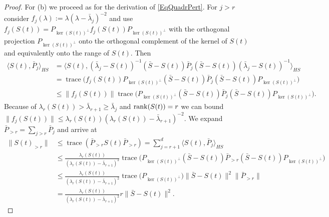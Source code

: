 \documentclass[preprint,aos]{imsart}
\numberwithin{equation}{section}
\theoremstyle{remark}
\DeclareMathOperator{\trace}{trace}
\providecommand{\norm}[1]{\lVert #1 \rVert}
\providecommand{\scapro}[2]{\langle #1,#2 \rangle}
\renewcommand{\le}{\leqslant}
\renewcommand{\ge}{\geqslant}
\begin{document}
\begin{appendix}
\begin{proof}
For (b) we proceed as for the derivation of \eqref{EqQuadrPert}. For $j>r$ consider $f_j(\lambda):=\lambda(\lambda-\bar\lambda_j)^{-2}$ and use  $f_j(S(t))=P_{\ker(S(t))^\perp}f_j(S(t))P_{\ker(S(t))^\perp}$ with the orthogonal projection $P_{\ker(S(t))^\perp}$ onto the orthogonal complement of the kernel of $S(t)$ and equivalently onto the range of $S(t)$. Then
\begin{align*}
\scapro{S(t)}{\bar P_j}_{HS} &= \scapro{S(t)}{(\bar\lambda_{j}-S(t))^{-1}(\bar S-S(t))\bar P_{j}(\bar S-S(t))(\bar\lambda_{j}-S(t))^{-1}}_{HS}\\
 &= \trace\Big(f_j(S(t))P_{\ker(S(t))^\perp}(\bar S-S(t))\bar P_{j}(\bar S-S(t))P_{\ker(S(t))^\perp}\Big)\\
&\le \norm{f_j(S(t))}\trace\Big(P_{\ker(S(t))^\perp}(\bar S-S(t))\bar P_j(\bar S-S(t))P_{\ker(S(t))^\perp}\Big).
\end{align*}
Because of $\lambda_r(S(t))>\bar\lambda_{r+1}\ge\bar\lambda_j$ and $\operatorname{rank}(S(t))=r$ we can bound $\norm{f_j(S(t))}\le \lambda_r(S(t))(\lambda_r(S(t))-\bar\lambda_{r+1})^{-2}$. We expand $\bar P_{>r}=\sum_{j>r}\bar P_j$ and arrive at
\begin{align*}
\norm{S(t)_{>r}} &\le \trace(\bar P_{>r}S(t)\bar P_{>r})= \sum_{j=r+1}^d \scapro{S(t)}{\bar P_j}_{HS}\\
&\le \frac{\lambda_r(S(t))}{(\lambda_r(S(t))-\bar\lambda_{r+1})^2}\trace\Big(P_{\ker(S(t))^\perp}(\bar S-S(t))\bar P_{>r}(\bar S-S(t))P_{\ker(S(t))^\perp}\Big)\\
&\le \frac{\lambda_r(S(t))}{(\lambda_r(S(t))-\bar\lambda_{r+1})^2}\trace\big(P_{\ker(S(t))^\perp}\big)\norm{\bar S-S(t)}^2\norm{\bar P_{>r}}\\
&= \frac{\lambda_r(S(t))}{(\lambda_r(S(t))-\bar\lambda_{r+1})^2}r\norm{\bar S-S(t)}^2.
\end{align*}


\end{proof}
\end{appendix}
\end{document}
